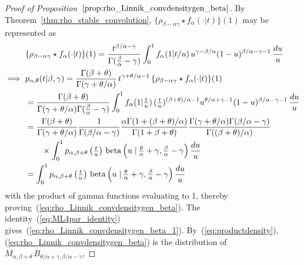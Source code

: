 \documentclass[a4paper,12pt]{article}
\begin{document}
{{{ \begin{proof}[Proof of Proposition~$\ref{prop:rho_Linnik_convdensitygen_beta}$]
\label{proof:rho_Linnik_convdensitygen_beta}
By  Theorem~\ref{thm:rho_stable_convolution}, 
$\{\rho_{\beta-\alpha\gamma}\star f_\alpha(\cdot\vert  t)\}(1)$ may be represented as 
\begin{align*}
&\{\rho_{\beta-\alpha\gamma} \star f_\alpha(\cdot\vert t)\}(1)
=  \frac{t^{\beta/\alpha-\gamma}}{\Gamma(\tfrac{\beta}{\alpha}-\gamma)}
  \int_0^1 f_\alpha(1\vert t/u) \, u^{\gamma-\beta/\alpha}  (1-u)^{\beta/\alpha-\gamma-1}  \, \frac{du}{u} \\
\implies \;
 &p_{\alpha,\theta}(t \vert \beta,\gamma) 
= \frac{\Gamma(\beta+\theta)}{\Gamma(\gamma+\theta/\alpha)} \, t^{\gamma+\theta/\alpha-1} \,
\{\rho_{\beta-\alpha\gamma} \star f_\alpha(\cdot\vert t)\}(1)  \\
&=  \frac{\Gamma(\beta+\theta)}{\Gamma(\gamma+\theta/\alpha)\Gamma(\tfrac{\beta}{\alpha}-\gamma)}
  \int_0^1 f_\alpha(1\vert \tfrac{t}{u}) \, (\tfrac{t}{u})^{(\beta+\theta)/\alpha-1} 
    u^{\theta/\alpha+\gamma-1} (1-u)^{\beta/\alpha-\gamma-1}  \, \frac{du}{u}  \\
&= \frac{\Gamma(\beta+\theta)}{\Gamma(\gamma+\theta/\alpha)} \frac{1}{\Gamma(\beta/\alpha-\gamma)}
    \frac{\alpha\Gamma(1+(\beta+\theta)/\alpha)}{\Gamma(1+\beta+\theta)} 
    \frac{\Gamma(\gamma+\theta/\alpha)\Gamma(\beta/\alpha-\gamma)}{\Gamma((\beta+\theta)/\alpha)} \\ 
&\qquad  \times  \int_0^1 p_{\alpha,\beta+\theta}\left(\tfrac{t}{u}\right) \, 
 {\rm beta} \left(u \left.\right\vert \tfrac{\theta}{\alpha}+\gamma, \tfrac{\beta}{\alpha}-\gamma\right) \frac{du}{u} \\
&= \int_0^1 p_{\alpha,\beta+\theta}\left(\tfrac{t}{u}\right) \, 
 {\rm beta} \left(u \left.\right\vert \tfrac{\theta}{\alpha}+\gamma, \tfrac{\beta}{\alpha}-\gamma\right) \frac{du}{u}
 \end{align*}
 with the  product of gamma functions evaluating to 1, thereby proving~(\ref{eq:rho_Linnik_convdensitygen_beta}). 
 The identity~(\ref{eq:ML4par_identity}) gives~(\ref{eq:rho_Linnik_convdensitygen_beta_1}).
 By~(\ref{eq:productdensity}), (\ref{eq:rho_Linnik_convdensitygen_beta}) is the distribution of 
 $M_{\alpha,\beta+\theta} \, B_{\theta/\alpha+\gamma,\beta/\alpha-\gamma}$, 

\end{proof}}}}
\end{document}
